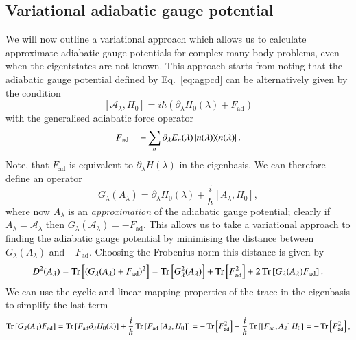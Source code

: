 \subsection{Variational adiabatic gauge potential}
\label{sec:varcd}
We will now outline a variational approach which allows us to calculate approximate adiabatic gauge potentials for complex many-body problems, even when the eigentstates are not known. This approach starts from noting that the adiabatic gauge potential defined by Eq.~\eqref{eq:agpcd} can be alternatively given by the condition \cite{jarzynski2013generating,sels2017minimizing,kolodrubetz2017geometry}
\begin{equation}
    \left[ \mathcal{A}_\lambda, H_0 \right] = i \hbar \left( \partial_\lambda H_0(\lambda) + F_\text{ad} \right)
\end{equation}
with the generalised adiabatic force operator
\begin{equation}
    F_\text{ad} = - \sum_n \partial_\lambda E_n (\lambda) \ketbra{n(\lambda)}.
\end{equation}
Note, that $F_\text{ad}$ is equivalent to $\partial_\lambda H(\lambda)$ in the eigenbasis. We can therefore define an operator
\begin{equation}\label{eq:glambda}
    G_\lambda (A_\lambda) = \partial_\lambda H_0(\lambda) + \frac{i}{\hbar} \left[ A_\lambda, H_0 \right],
\end{equation}
where now $A_\lambda$ is an {\it approximation} of the adiabatic gauge potential; clearly if $A_\lambda = \mathcal{A}_\lambda$ then $G_\lambda (\mathcal{A}_\lambda) = -F_\text{ad}$. This allows us to take a variational approach to finding the adiabatic gauge potential by minimising the distance between $G_\lambda(A_\lambda)$ and $-F_\text{ad}$. Choosing the Frobenius norm this distance is given by
\begin{equation}
    D^2(A_\lambda) = \Tr \left[ \left(G_\lambda(A_\lambda) + F_\text{ad} \right)^2 \right] = \Tr \left[G_\lambda^2 (A_\lambda)\right] + \Tr \left[F_\text{ad}^2\right] + 2\Tr \left[G_\lambda (A_\lambda) F_\text{ad}\right].
\end{equation}
We can use the cyclic and linear mapping properties of the trace in the eigenbasis to simplify the last term
\begin{equation}
    \Tr\left[G_\lambda (A_\lambda) F_\text{ad}\right] = \Tr\left[ F_\text{ad} \partial_\lambda H_0(\lambda) \right] + \frac{i}{\hbar} \Tr \left[ F_\text{ad} \left[ A_\lambda, H_0 \right] \right] = - \Tr \left[ F_\text{ad}^2 \right] - \frac{i}{\hbar} \Tr \left[ \left[ F_\text{ad}, A_\lambda\right] H_0 \right] =  - \Tr \left[ F_\text{ad}^2 \right],
\end{equation}
